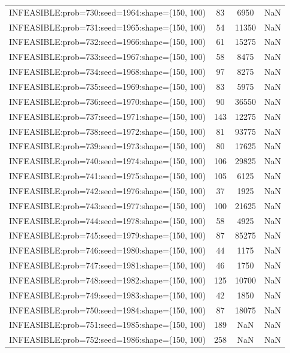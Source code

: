\begin{longtable}{lccc}
INFEASIBLE:prob=730:seed=1964:shape=(150, 100) &    83 &  6950 &    NaN \\
INFEASIBLE:prob=731:seed=1965:shape=(150, 100) &    54 & 11350 &    NaN \\
INFEASIBLE:prob=732:seed=1966:shape=(150, 100) &    61 & 15275 &    NaN \\
INFEASIBLE:prob=733:seed=1967:shape=(150, 100) &    58 &  8475 &    NaN \\
INFEASIBLE:prob=734:seed=1968:shape=(150, 100) &    97 &  8275 &    NaN \\
INFEASIBLE:prob=735:seed=1969:shape=(150, 100) &    83 &  5975 &    NaN \\
INFEASIBLE:prob=736:seed=1970:shape=(150, 100) &    90 & 36550 &    NaN \\
INFEASIBLE:prob=737:seed=1971:shape=(150, 100) &   143 & 12275 &    NaN \\
INFEASIBLE:prob=738:seed=1972:shape=(150, 100) &    81 & 93775 &    NaN \\
INFEASIBLE:prob=739:seed=1973:shape=(150, 100) &    80 & 17625 &    NaN \\
INFEASIBLE:prob=740:seed=1974:shape=(150, 100) &   106 & 29825 &    NaN \\
INFEASIBLE:prob=741:seed=1975:shape=(150, 100) &   105 &  6125 &    NaN \\
INFEASIBLE:prob=742:seed=1976:shape=(150, 100) &    37 &  1925 &    NaN \\
INFEASIBLE:prob=743:seed=1977:shape=(150, 100) &   100 & 21625 &    NaN \\
INFEASIBLE:prob=744:seed=1978:shape=(150, 100) &    58 &  4925 &    NaN \\
INFEASIBLE:prob=745:seed=1979:shape=(150, 100) &    87 & 85275 &    NaN \\
INFEASIBLE:prob=746:seed=1980:shape=(150, 100) &    44 &  1175 &    NaN \\
INFEASIBLE:prob=747:seed=1981:shape=(150, 100) &    46 &  1750 &    NaN \\
INFEASIBLE:prob=748:seed=1982:shape=(150, 100) &   125 & 10700 &    NaN \\
INFEASIBLE:prob=749:seed=1983:shape=(150, 100) &    42 &  1850 &    NaN \\
INFEASIBLE:prob=750:seed=1984:shape=(150, 100) &    87 & 18075 &    NaN \\
INFEASIBLE:prob=751:seed=1985:shape=(150, 100) &   189 &   NaN &    NaN \\
INFEASIBLE:prob=752:seed=1986:shape=(150, 100) &   258 &   NaN &    NaN \\

\end{longtable}

